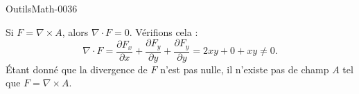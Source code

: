 
\begin{corrige}{OutilsMath-0036}

    Si $F=\nabla\times A$, alors $\nabla\cdot F=0$. Vérifions cela :
    \begin{equation}
        \nabla\cdot F=\frac{ \partial F_x }{ \partial x }+\frac{ \partial F_y }{ \partial y }+\frac{ \partial F_y }{ \partial y }=2xy+0+xy\neq 0.
    \end{equation}
    Étant donné que la divergence de $F$ n'est pas nulle, il n'existe pas de champ $A$ tel que $F=\nabla \times A$.

\end{corrige}
